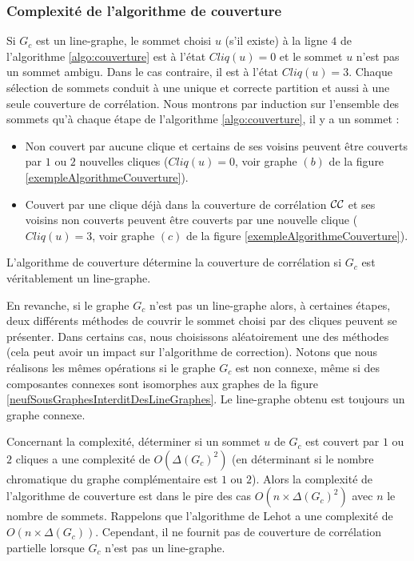 \subsubsection{Complexit\'e de l'algorithme de couverture}

Si $G_c$ est un line-graphe, le sommet choisi $u$ (s'il existe) \`a la ligne $4$ de l'algorithme \ref{algo:couverture}  est \`a l'\'etat $Cliq(u) = 0$ et le sommet $u$ n'est pas un sommet ambigu. Dans le cas contraire, il est \`a l'\'etat $Cliq(u) = 3$.
Chaque s\'election de sommets conduit \`a  une unique et correcte partition et aussi \`a une seule couverture de corr\'elation. 
Nous montrons par induction sur l'ensemble des sommets qu'\`a chaque \'etape de l'algorithme \ref{algo:couverture}, il y a un sommet :
\begin{itemize}
	\item Non couvert par aucune clique et certains de ses voisins peuvent \^etre couverts par $1$ ou $2$ nouvelles cliques ($Cliq(u) = 0$, voir graphe $(b)$ de la figure \ref{exempleAlgorithmeCouverture}).
	\item Couvert par une clique d\'ej\`a dans la couverture de corr\'elation ${\cal CC}$ et ses voisins non couverts peuvent \^etre couverts par une nouvelle clique  ($Cliq(u) = 3$, voir graphe $(c)$ de la figure \ref{exempleAlgorithmeCouverture}).
\end{itemize} 
L'algorithme de couverture d\'etermine la couverture de corr\'elation si $G_c$ est v\'eritablement un line-graphe.

En revanche, si le graphe $G_c$ n'est pas un line-graphe alors, \`a certaines \'etapes, deux diff\'erents m\'ethodes de couvrir le sommet choisi par des cliques peuvent se pr\'esenter. Dans certains cas, nous choisissons al\'eatoirement  une des m\'ethodes (cela peut avoir un impact sur l'algorithme de correction). 
Notons que nous r\'ealisons les m\^emes op\'erations si le graphe $G_c$ est non connexe, m\^eme si des composantes connexes sont isomorphes aux graphes de la figure  \ref{neufSousGraphesInterditDesLineGraphes}. 
Le line-graphe obtenu est toujours un graphe connexe.
\newline

Concernant la complexit\'e, d\'eterminer si un sommet $u$ de $G_c$ est couvert par $1$ ou $2$ cliques a une complexit\'e de $O(\Delta(G_c)^2)$ (en d\'eterminant si le nombre chromatique du graphe compl\'ementaire est $1$ ou $2$). 
Alors la complexit\'e de l'algorithme de couverture est dans le pire des cas $O(n \times \Delta(G_c)^2)$ avec $n$ le nombre de sommets.  
Rappelons que l'algorithme de Lehot \cite{decompositionEnCliquesParArcs} a une complexit\'e de $O(n \times \Delta(G_c))$. Cependant, il ne fournit pas de couverture de corr\'elation partielle lorsque  $G_c$ n'est pas un line-graphe.
\newline

